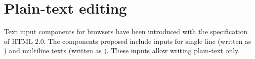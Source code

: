 \section{Plain-text editing}

Text input components for browsers have been introduced with the specification of HTML 2.0\cite{RFC1866}. The components proposed include inputs for single line (written as ) and multiline texts (written as ). These inputs allow writing plain-text only.

